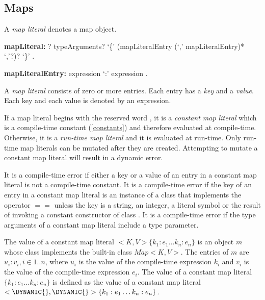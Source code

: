 \documentclass{article}
\newcommand{\code}[1]{{\sf #1}}
\begin{document}

\subsection{Maps}

\LMHash{}
A {\em map literal} denotes a map object.

\begin{grammar}
{\bf mapLiteral:}
      \CONST{}?  typeArguments? `\{' (mapLiteralEntry (`,' mapLiteralEntry)* `,'?)? `\}'
    .

{\bf mapLiteralEntry:}
	expression `{\escapegrammar :}' expression
    .
\end{grammar}

\LMHash{}
A {\em map literal} consists of zero or more entries. Each entry has a {\em key} and a {\em value}.  Each key and each value is denoted by an expression.

\LMHash{}
If a map literal begins with the reserved word \CONST{}, it is a {\em constant map literal} which is a compile-time constant (\ref{constants}) and therefore evaluated at compile-time. Otherwise, it is a {\em run-time map literal} and it is evaluated at run-time. Only run-time map literals can be mutated
after they are created. Attempting to mutate a constant map literal will result in a dynamic error.

\LMHash{}
It is a compile-time error if either a key or a value of an entry in a constant map literal is not a compile-time constant. It is a compile-time error if the key of an entry in a constant map literal is an instance of a class that implements the operator $==$ unless the key is a
string, an integer, a literal symbol or the result of invoking a constant constructor of class .
It is a compile-time error if the type arguments of a constant map literal include a type parameter.

\LMHash{}
The value of a constant map literal  \CONST{}$ <K, V>\{k_1:e_1\ldots k_n :e_n\}$ is an object $m$ whose class implements the built-in class $Map<K, V>$. The entries of $m$ are $u_i:v_i, i \in 1 .. n$, where $u_i$ is the value of the compile-time expression $k_i$ and $v_i$ is the value of the compile-time expression $e_i$.  The value of a constant map literal  \CONST{} $\{k_1:e_1\ldots k_n :e_n\}$ is defined as the value of a constant map literal \CONST{} $<\DYNAMIC{}, \DYNAMIC{}>\{k_1:e_1\ldots k_n :e_n\}$.
\end{document}
